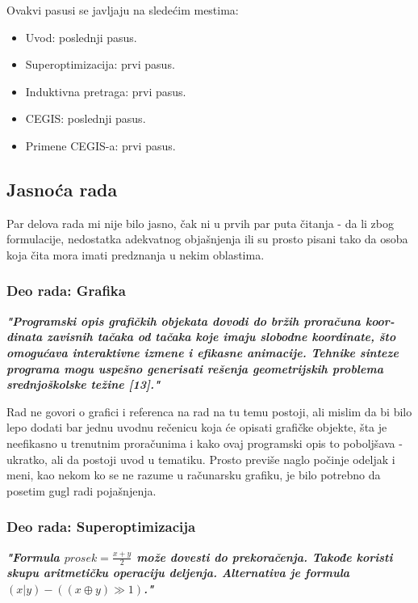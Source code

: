 \documentclass[a4paper]{report}
\begin{document}
Ovakvi pasusi se javljaju na sledećim mestima:
\begin{itemize}
	\item Uvod: poslednji pasus.
    \item Superoptimizacija: prvi pasus.
    \item Induktivna pretraga: prvi pasus.
    \item CEGIS: poslednji pasus.
    \item Primene CEGIS-a: prvi pasus.
\end{itemize}



\subsection{Jasnoća rada}

Par delova rada mi nije bilo jasno, čak ni u prvih par puta čitanja - da li zbog formulacije, nedostatka adekvatnog objašnjenja ili su prosto pisani tako da osoba koja čita mora imati predznanja u nekim oblastima.


\subsubsection{Deo rada: Grafika}

\textbf{\textit{"Programski opis grafičkih objekata dovodi do bržih proračuna koor-dinata zavisnih tačaka od tačaka koje imaju slobodne koordinate, što omogućava interaktivne izmene i efikasne animacije. Tehnike sinteze programa mogu uspešno generisati rešenja geometrijskih problema srednjoškolske težine [13]."}}

Rad ne govori o grafici i referenca na rad na tu temu postoji, ali mislim da bi bilo lepo dodati bar jednu uvodnu rečenicu koja će opisati grafičke objekte, šta je neefikasno u trenutnim proračunima i kako ovaj programski opis to poboljšava - ukratko, ali da postoji uvod u tematiku. Prosto previše naglo počinje odeljak i meni, kao nekom ko se ne razume u računarsku grafiku, je bilo potrebno da posetim gugl radi pojašnjenja. 


\subsubsection{Deo rada: Superoptimizacija}
\textbf{\textit{"Formula $prosek = \frac{x+y}{2}$ može dovesti do prekoračenja. Takođe koristi skupu aritmetičku operaciju deljenja. Alternativa je formula $(x | y) - ((x \oplus y) \gg 1)$."}}
\end{document}
